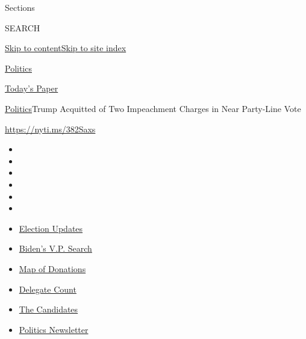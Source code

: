 Sections

SEARCH

\protect\hyperlink{site-content}{Skip to
content}\protect\hyperlink{site-index}{Skip to site index}

\href{https://www.nytimes.com/section/politics}{Politics}

\href{https://myaccount.nytimes.com/auth/login?response_type=cookie\&client_id=vi}{}

\href{https://www.nytimes.com/section/todayspaper}{Today's Paper}

\href{/section/politics}{Politics}\textbar{}Trump Acquitted of Two
Impeachment Charges in Near Party-Line Vote

\url{https://nyti.ms/382Saxs}

\begin{itemize}
\item
\item
\item
\item
\item
\item
\end{itemize}

\begin{itemize}
\item
  \href{https://www.nytimes.com/2020/07/31/us/elections/biden-vs-trump.html?action=click\&pgtype=Article\&state=default\&region=TOP_BANNER\&context=storylines_menu}{Election
  Updates}
\item
  \href{https://www.nytimes.com/article/biden-vice-president-2020.html?action=click\&pgtype=Article\&state=default\&region=TOP_BANNER\&context=storylines_menu}{Biden's
  V.P. Search}
\item
  \href{https://www.nytimes.com/interactive/2020/07/24/us/politics/trump-biden-campaign-donors.html?action=click\&pgtype=Article\&state=default\&region=TOP_BANNER\&context=storylines_menu}{Map
  of Donations}
\item
  \href{https://www.nytimes.com/interactive/2020/us/elections/delegate-count-primary-results.html?action=click\&pgtype=Article\&state=default\&region=TOP_BANNER\&context=storylines_menu}{Delegate
  Count}
\item
  \href{https://www.nytimes.com/interactive/2019/us/politics/2020-presidential-candidates.html?action=click\&pgtype=Article\&state=default\&region=TOP_BANNER\&context=storylines_menu}{The
  Candidates}
\item
  \href{https://www.nytimes.com/newsletters/politics?action=click\&pgtype=Article\&state=default\&region=TOP_BANNER\&context=storylines_menu}{Politics
  Newsletter}
\end{itemize}


